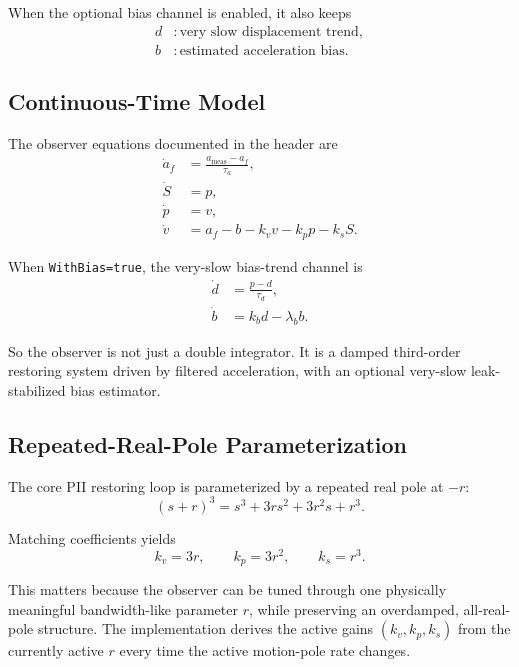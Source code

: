 \documentclass[conference]{IEEEtran}
\begin{document}
When the optional bias channel is enabled, it also keeps
\begin{align}
d &: \text{very slow displacement trend},\\
b &: \text{estimated acceleration bias}.
\end{align}

\subsection{Continuous-Time Model}

The observer equations documented in the header are
\begin{align}
\dot{a}_f &= \frac{a_{\mathrm{meas}} - a_f}{\tau_a}, \label{eq:afdot}\\
\dot{S}   &= p, \label{eq:Sdot}\\
\dot{p}   &= v, \label{eq:pdot}\\
\dot{v}   &= a_f - b - k_v v - k_p p - k_s S. \label{eq:vdot}
\end{align}

When \texttt{WithBias=true}, the very-slow bias-trend channel is
\begin{align}
\dot{d} &= \frac{p-d}{\tau_d}, \label{eq:ddot}\\
\dot{b} &= k_b d - \lambda_b b. \label{eq:bdot}
\end{align}

So the observer is not just a double integrator. It is a damped
third-order restoring system driven by filtered acceleration, with an
optional very-slow leak-stabilized bias estimator.

\subsection{Repeated-Real-Pole Parameterization}

The core PII restoring loop is parameterized by a repeated real pole at
\(-r\):
\begin{equation}
(s+r)^3 = s^3 + 3rs^2 + 3r^2 s + r^3.
\end{equation}

Matching coefficients yields
\begin{equation}
k_v = 3r,\qquad
k_p = 3r^2,\qquad
k_s = r^3.
\end{equation}

This matters because the observer can be tuned through one physically
meaningful bandwidth-like parameter \(r\), while preserving an overdamped,
all-real-pole structure. The implementation derives the active gains
\((k_v,k_p,k_s)\) from the currently active \(r\) every time the active
motion-pole rate changes.
\end{document}

